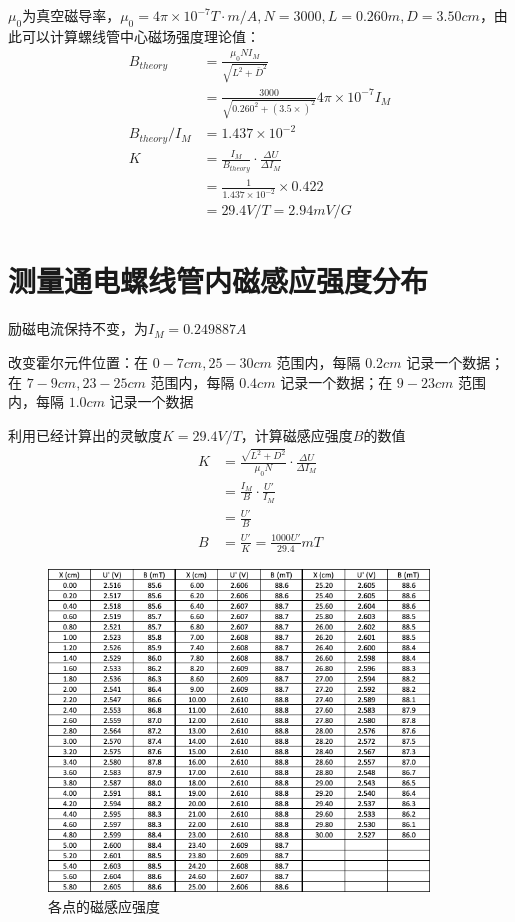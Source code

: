 \documentclass{article}
\begin{document}
$\mu_0$为真空磁导率，$\mu_0 = 4\pi \times 10^{-7} T \cdot m/A, N=3000, L = 0.260 m, D = 3.50 cm$，由此可以计算螺线管中心磁场强度理论值：
\begin{align*}
    B_{theory} &= \frac{\mu_0 N I_M}{\sqrt{L^2 + \bar{D}^2}} \\
    &= \frac{3000}{\sqrt{0.260^2 + (3.5 \times )^2}} 4\pi \times 10^{-7} I_M \\
    B_{theory} / I_M &= 1.437 \times 10^{-2} \\
    K &= \frac{I_M}{B_{theory}} \cdot \frac{\Delta U}{\Delta I_M} \\
    &= \frac{1}{1.437 \times 10^{-2}} \times 0.422 \\
    &= 29.4 V/T = 2.94 mV/G
\end{align*}

\section{测量通电螺线管内磁感应强度分布}
励磁电流保持不变，为$I_M = 0.249887A$

改变霍尔元件位置：在 $0-7cm, 25-30cm$ 范围内，每隔 $0.2cm$ 记录一个数据；在 $7-9cm, 23-25cm$ 范围内，每隔 $0.4cm$ 记录一个数据；在 $9-23cm$ 范围内，每隔 $1.0cm$ 记录一个数据

利用已经计算出的灵敏度$K = 29.4 V/T$，计算磁感应强度$B$的数值
\begin{align*}
    K &= \frac{\sqrt{L^2 + D^2}}{\mu_0 N} \cdot \frac{\Delta U}{\Delta I_M} \\
    &= \frac{I_M}{B} \cdot \frac{U'}{I_M} \\
    &= \frac{U'}{B} \\
    B &= \frac{U'}{K} = \frac{1000U'}{29.4} mT
\end{align*}

\begin{figure}[htbp]
    \centering
    \includegraphics[width=0.9\textwidth]{B_value.png}
    \caption{各点的磁感应强度}
\end{figure}
\end{document}
